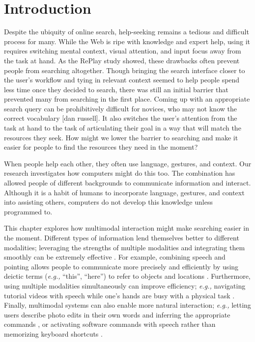 \section{Introduction}
Despite the ubiquity of online search, help-seeking remains a tedious and difficult process for many. While the Web is ripe with knowledge and expert help, using it requires switching mental context, visual attention, and input focus away from the task at hand. As the RePlay study showed, these drawbacks often prevent people from searching altogether. Though bringing the search interface closer to the user's workflow and tying in relevant context seemed to help people spend less time once they decided to search, there was still an initial barrier that prevented many from searching in the first place. 
Coming up with an appropriate search query can be prohibitively difficult for novices, who may not know the correct vocabulary [dan russell]. It also switches the user's attention from the task at hand to the task of articulating their goal in a way that will match the resources they seek. How might we lower the barrier to searching and make it easier for people to find the resources they need in the moment?

When people help each other, they often use language, gestures, and context. Our research investigates how computers might do this too. The combination has allowed people of different backgrounds to communicate information and interact. Although it is a habit of humans to incorporate language, gestures, and context into assisting others, computers do not develop this knowledge unless programmed to. 

This chapter explores how multimodal interaction might make searching easier in the moment. Different types of information lend themselves better to different modalities; leveraging the strengths of multiple modalities and integrating them smoothly can be extremely effective \cite{Oviatt1999}. For example, combining speech and pointing allows people to communicate more precisely and efficiently by using deictic terms (\textit{e.g.,} ``this'', ``here'') to refer to objects and locations \cite{Bolt1980, Laput2013}. Furthermore, using multiple modalities simultaneously can improve efficiency; \textit{e.g.,} navigating tutorial videos with speech while one's hands are busy with a physical task \cite{Chang2019}. Finally, multimodal systems can also enable more natural interaction; \textit{e.g.,} letting users describe photo edits in their own words and inferring the appropriate commands \cite{Laput2013}, or activating software commands with speech rather than memorizing keyboard shortcuts \cite{Kim2019}.

